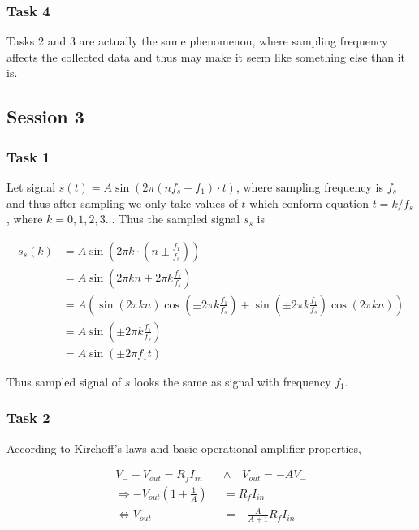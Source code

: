 \documentclass[12pt]{article}
\begin{document}
\subsubsection{Task 4}

Tasks 2 and 3 are actually the same phenomenon, where sampling frequency affects the collected data and thus may make it seem like something else than it is.

\subsection{Session 3}

\subsubsection{Task 1}

Let signal $s(t) = A \sin (2\pi(nf_s \pm f_1) \cdot t)$, where sampling frequency is $f_s$ and thus after sampling we only take values of $t$ which conform equation $t = k/f_s$, where $k = 0, 1, 2, 3...$ Thus the sampled signal $s_s$ is

\begin{align*}
s_s(k) &= A \sin (2\pi k \cdot (n \pm \frac{f_1}{f_s})) \\
&= A \sin (2\pi kn \pm 2\pi k \frac{f_1}{f_s}) \\
&= A (\sin (2\pi kn) \cos (\pm 2\pi k \frac{f_1}{f_s}) + \sin (\pm 2\pi k \frac{f_1}{f_s}) \cos (2\pi kn)) \\
&= A \sin (\pm 2\pi k \frac{f_1}{f_s}) \\
&= A \sin (\pm 2\pi f_1 t)
\end{align*}

Thus sampled signal of $s$ looks the same as signal with frequency $f_1$.

\subsubsection{Task 2}

According to Kirchoff's laws and basic operational amplifier properties,

\begin{align*}
V_- - V_{out} = R_f I_{in} \quad & \wedge \quad V_{out} = -AV_- \\
\Rightarrow -V_{out} (1 + \frac{1}{A}) &= R_f I_{in} \\
\Leftrightarrow V_{out} &= -\frac{A}{A + 1} R_f I_{in}
\end{align*}
\end{document}
